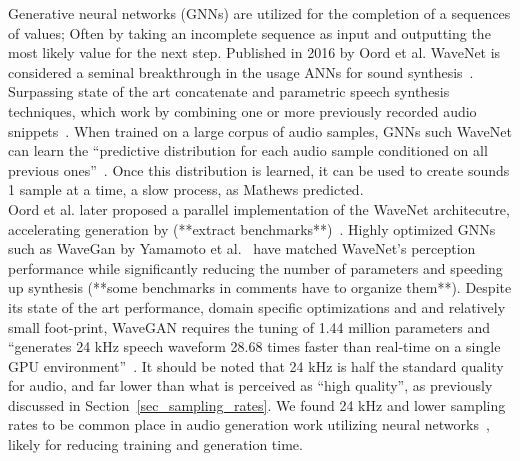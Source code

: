\documentclass[\main/thesis.tex]{subfiles}
\begin{document}
Generative neural networks (GNNs) are utilized for the completion of a sequences of values; Often by taking an incomplete sequence as input and outputting the most likely value for the next step. Published in 2016 by Oord et al. WaveNet is considered a seminal breakthrough in the usage ANNs for sound synthesis~\cite{oord2016wavenet}. Surpassing state of the art concatenate and parametric speech synthesis techniques, which work by combining one or more previously recorded audio snippets~\cite{schwarz2007corpus}. When trained on a large corpus of audio samples, GNNs such WaveNet can learn the \enquote{predictive distribution for each
audio sample conditioned on all previous ones}~\cite{oord2016wavenet}. Once this distribution is learned, it can be used to create sounds 1 sample at a time, a slow process, as Mathews predicted. \\
Oord et al. later proposed a parallel implementation of the WaveNet architecutre, accelerating generation by (**extract benchmarks**)~\cite{oord2017parallel}. Highly optimized GNNs such as WaveGan by Yamamoto et al.~\cite{yamamoto2020parallel} have matched WaveNet's perception performance while significantly reducing the number of parameters and speeding up synthesis (**some benchmarks in comments have to organize them**). Despite its state of the art performance, domain specific optimizations and and relatively small foot-print, WaveGAN requires the tuning of 1.44 million parameters and \enquote{generates 24 kHz speech waveform 28.68 times faster than real-time on a single GPU environment}~\cite{yamamoto2020parallel}. It should be noted that 24 kHz is half the standard quality for audio, and far lower than what is perceived as \enquote{high quality}, as previously discussed in Section~\ref{sec_sampling_rates}. We found 24 kHz and lower sampling rates to be common place in audio generation work utilizing neural networks~\cite{oord2017parallel,yamamoto2019parallel,aouameur2019neural,ramires2020neural}, likely for reducing training and generation time. 
\end{document}

